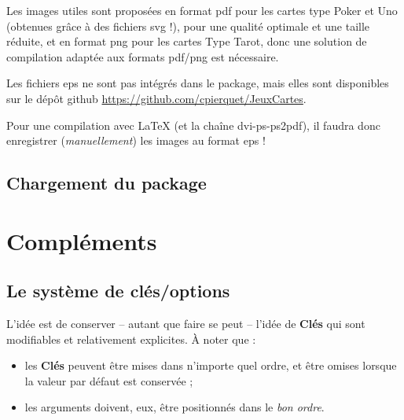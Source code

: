 \documentclass[a4paper]{article}
\newcommand\Cle[1]{{\bfseries\sffamily\textlangle #1\textrangle}}
\begin{document}
{{{{{{{{{{{\begin{codeattention}
Les images utiles sont proposées en format \textsf{pdf} pour les cartes type \textsf{Poker} et \textsf{Uno} (obtenues grâce à des fichiers \textsf{svg} !), pour une qualité optimale et une taille réduite, et en format \textsf{png} pour les cartes Type \textsf{Tarot}, donc une solution de compilation adaptée aux formats \textsf{pdf/png} est nécessaire.

\smallskip

Les fichiers \textsf{eps} ne sont pas intégrés dans le package, mais elles sont disponibles sur le dépôt \textsf{github} \url{https://github.com/cpierquet/JeuxCartes}.

\smallskip

Pour une compilation avec \LaTeX{} (et la chaîne \textsf{dvi-ps-ps2pdf}), il faudra donc enregistrer (\textit{manuellement}) les images au format \textsf{eps} !
\end{codeattention}

\subsection{Chargement du package}



\section{Compléments}

\subsection{Le système de \og clés/options \fg}

\begin{codeidee}
L'idée est de conserver -- autant que faire se peut -- l'idée de \Cle{Clés} qui sont modifiables et relativement explicites. À noter que :
%
\begin{itemize}[leftmargin=*]
	\item les \Cle{Clés} peuvent être mises dans n'importe quel ordre, et être omises lorsque la valeur par défaut est conservée ;
	\item les \textsf{arguments} doivent, eux, être positionnés dans le \textit{bon ordre}.
\end{itemize}
\end{codeidee}

}}}}}}}}}}}
\end{document}
